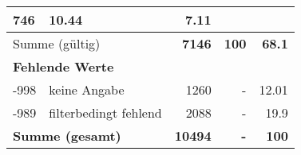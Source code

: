 \begin{longtable}{lXrrr}
       \num{746} &
       \num[round-mode=places,round-precision=2]{10.44} &
         \num[round-mode=places,round-precision=2]{7.11} \\
     \midrule
     \multicolumn{2}{l}{Summe (gültig)} &
       \textbf{\num{7146}} &
     \textbf{\num{100}} &
       \textbf{\num[round-mode=places,round-precision=2]{68.1}} \\
     \multicolumn{5}{l}{\textbf{Fehlende Werte}}\\
       -998 &
       keine Angabe &
         \num{1260} &
        - &
         \num[round-mode=places,round-precision=2]{12.01} \\
       -989 &
       filterbedingt fehlend &
         \num{2088} &
        - &
         \num[round-mode=places,round-precision=2]{19.9} \\
     \midrule
     \multicolumn{2}{l}{\textbf{Summe (gesamt)}} &
          \textbf{\num{10494}} &
        \textbf{-} &
        \textbf{\num{100}} \\
     \bottomrule
     \end{longtable}
     
